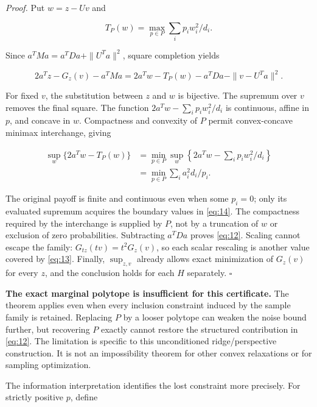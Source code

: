 \documentclass[11pt]{article}
\begin{document}
\emph{Proof.} Put \(w=z-Uv\) and

\[
T_P(w)=\max_{p\in P}\sum_i p_iw_i^2/d_i.
\]

Since \(a^TMa=a^TDa+\|U^Ta\|^2\), square completion yields

\begin{equation}\label{eq:13}
2a^Tz-G_z(v)-a^TMa
=2a^Tw-T_P(w)-a^TDa-\|v-U^Ta\|^2. 
\end{equation}

For fixed \(v\), the substitution between \(z\) and \(w\) is bijective.
The supremum over \(v\) removes the final square. The function
\(2a^Tw-\sum_i p_iw_i^2/d_i\) is continuous, affine in \(p\), and
concave in \(w\). Compactness and convexity of \(P\) permit
convex-concave minimax interchange, giving

\begin{equation}\label{eq:14}
\begin{aligned}
\sup_w\{2a^Tw-T_P(w)\}
&=\min_{p\in P}\sup_w
\left\{2a^Tw-\sum_i p_iw_i^2/d_i\right\}\\
&=\min_{p\in P}\sum_i a_i^2d_i/p_i.
\end{aligned} 
\end{equation}

The original payoff is finite and continuous even when some \(p_i=0\);
only its evaluated supremum acquires the boundary values in
\eqref{eq:14}. The compactness required by the interchange is supplied
by \(P\), not by a truncation of \(w\) or exclusion of zero
probabilities. Subtracting \(a^TDa\) proves \eqref{eq:12}. Scaling
cannot escape the family: \(G_{tz}(tv)=t^2G_z(v)\), so each scalar
rescaling is another value covered by \eqref{eq:13}. Finally,
\(\sup_{z,v}\) already allows exact minimization of \(G_z(v)\) for every
\(z\), and the conclusion holds for each \(H\) separately. \(\square\)

\textbf{The exact marginal polytope is insufficient for this
certificate.} The theorem applies even when every inclusion constraint
induced by the sample family is retained. Replacing \(P\) by a looser
polytope can weaken the noise bound further, but recovering \(P\)
exactly cannot restore the structured contribution in \eqref{eq:12}. The
limitation is specific to this unconditioned ridge/perspective
construction. It is not an impossibility theorem for other convex
relaxations or for sampling optimization.

The information interpretation identifies the lost constraint more
precisely. For strictly positive \(p\), define
\end{document}

